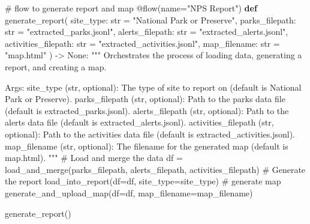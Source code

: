 \documentclass[
  letterpaper,
  DIV=11,
  numbers=noendperiod]{scrartcl}
\newenvironment{Shaded}{\begin{snugshade}}{\end{snugshade}}
\newcommand{\AttributeTok}[1]{\textcolor[rgb]{0.40,0.45,0.13}{#1}}
\newcommand{\BuiltInTok}[1]{\textcolor[rgb]{0.00,0.23,0.31}{#1}}
\newcommand{\CommentTok}[1]{\textcolor[rgb]{0.37,0.37,0.37}{#1}}
\newcommand{\KeywordTok}[1]{\textcolor[rgb]{0.00,0.23,0.31}{\textbf{#1}}}
\newcommand{\NormalTok}[1]{\textcolor[rgb]{0.00,0.23,0.31}{#1}}
\newcommand{\OperatorTok}[1]{\textcolor[rgb]{0.37,0.37,0.37}{#1}}
\newcommand{\StringTok}[1]{\textcolor[rgb]{0.13,0.47,0.30}{#1}}
\newcommand{\VariableTok}[1]{\textcolor[rgb]{0.07,0.07,0.07}{#1}}
\begin{document}
\begin{Shaded}
\begin{Highlighting}[]
\CommentTok{\# flow to generate report and map}
\AttributeTok{@flow}\NormalTok{(name}\OperatorTok{=}\StringTok{"NPS Report"}\NormalTok{)}
\KeywordTok{def}\NormalTok{ generate\_report(}
\NormalTok{        site\_type: }\BuiltInTok{str} \OperatorTok{=} \StringTok{"National Park or Preserve"}\NormalTok{,}
\NormalTok{        parks\_filepath: }\BuiltInTok{str} \OperatorTok{=} \StringTok{"extracted\_parks.jsonl"}\NormalTok{,}
\NormalTok{        alerts\_filepath: }\BuiltInTok{str} \OperatorTok{=} \StringTok{"extracted\_alerts.jsonl"}\NormalTok{,}
\NormalTok{        activities\_filepath: }\BuiltInTok{str} \OperatorTok{=} \StringTok{"extracted\_activities.jsonl"}\NormalTok{,}
\NormalTok{        map\_filename: }\BuiltInTok{str} \OperatorTok{=} \StringTok{"map.html"}
\NormalTok{    ) }\OperatorTok{{-}\textgreater{}} \VariableTok{None}\NormalTok{:}
    \CommentTok{"""}
\CommentTok{    Orchestrates the process of loading data, generating a report, and creating a map.}

\CommentTok{    Args:}
\CommentTok{        site\_type (str, optional): The type of site to report on (default is \textquotesingle{}National Park or Preserve\textquotesingle{}).}
\CommentTok{        parks\_filepath (str, optional): Path to the parks data file (default is \textquotesingle{}extracted\_parks.jsonl\textquotesingle{}).}
\CommentTok{        alerts\_filepath (str, optional): Path to the alerts data file (default is \textquotesingle{}extracted\_alerts.jsonl\textquotesingle{}).}
\CommentTok{        activities\_filepath (str, optional): Path to the activities data file (default is \textquotesingle{}extracted\_activities.jsonl\textquotesingle{}).}
\CommentTok{        map\_filename (str, optional): The filename for the generated map (default is \textquotesingle{}map.html\textquotesingle{}).}
\CommentTok{    """}
    \CommentTok{\# Load and merge the data}
\NormalTok{    df }\OperatorTok{=}\NormalTok{ load\_and\_merge(parks\_filepath, alerts\_filepath, activities\_filepath)}
    \CommentTok{\# Generate the report}
\NormalTok{    load\_into\_report(df}\OperatorTok{=}\NormalTok{df, site\_type}\OperatorTok{=}\NormalTok{site\_type)}
    \CommentTok{\# generate map}
\NormalTok{    generate\_and\_upload\_map(df}\OperatorTok{=}\NormalTok{df, map\_filename}\OperatorTok{=}\NormalTok{map\_filename)}

\NormalTok{generate\_report()}
\end{Highlighting}
\end{Shaded}
\end{document}
